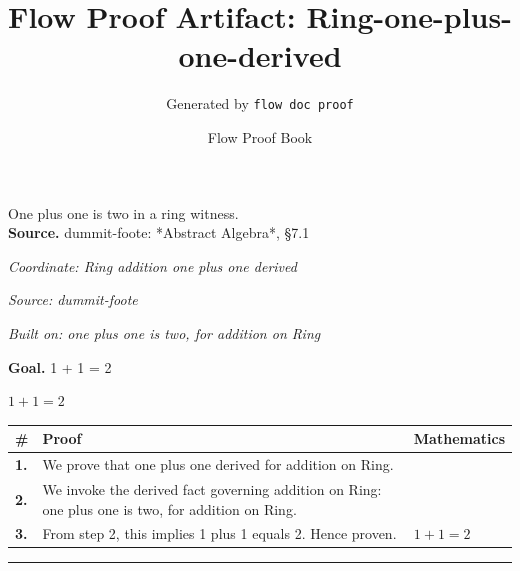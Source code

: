 \documentclass[11pt]{article}
\title{Flow Proof Artifact: Ring-one-plus-one-derived}
\author{Generated by \texttt{flow doc proof}}
\date{Flow Proof Book}
\theoremstyle{definition}
\begin{document}
\maketitle
One plus one is two in a ring witness.\\[0.5em]
\textbf{Source.} dummit-foote: *Abstract Algebra*, §7.1\\[0.5em]
\bigskip
{}\par
\smallskip\noindent\textit{Coordinate: Ring \cdot addition \cdot one plus one derived}\par
\smallskip\noindent\textit{Source: dummit-foote}\par
\smallskip\noindent\textit{Built on: one plus one is two, for addition on Ring}\par
\medskip
\noindent\textbf{Goal.} 1 + 1 = 2\par
\noindent$\displaystyle 1 + 1 = 2$\par
\medskip
\noindent
\begin{tabular}{@{} >{\raggedright\arraybackslash}p{} >{\raggedright\arraybackslash}p{} >{\raggedleft\arraybackslash}p{} @{}}
\textbf{\#} & \textbf{Proof} & \textbf{Mathematics} \\
\midrule
\textbf{1.} & We prove that one plus one derived for addition on Ring. & \\[0.45em]
\textbf{2.} & We invoke the derived fact governing addition on Ring: one plus one is two, for addition on Ring. & \\[0.45em]
\textbf{3.} & From step 2, this implies 1 plus 1 equals 2. Hence proven. & $\displaystyle 1 + 1 = 2$ \\[0.45em]
\bottomrule
\end{tabular}
\label{thm:Ring-addition-one_plus_one_derived}
\par\medskip\hrule
\end{document}
